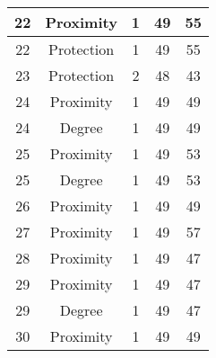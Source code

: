 \documentclass[results.tex]{subfiles}
\begin{document}
\begin{center}
\begin{tabular}{| c || c | c | c | c |}
            \hline
            22                      & Proximity                    & 1                      & 49                      & 55                   \\
            \hline
            22                      & Protection                   & 1                      & 49                      & 55                   \\
            \hline
            23                      & Protection                   & 2                      & 48                      & 43                   \\
            \hline
            24                      & Proximity                    & 1                      & 49                      & 49                   \\
            \hline
            24                      & Degree                       & 1                      & 49                      & 49                   \\
            \hline
            25                      & Proximity                    & 1                      & 49                      & 53                   \\
            \hline
            25                      & Degree                       & 1                      & 49                      & 53                   \\
            \hline
            26                      & Proximity                    & 1                      & 49                      & 49                   \\
            \hline
            27                      & Proximity                    & 1                      & 49                      & 57                   \\
            \hline
            28                      & Proximity                    & 1                      & 49                      & 47                   \\
            \hline
            29                      & Proximity                    & 1                      & 49                      & 47                   \\
            \hline
            29                      & Degree                       & 1                      & 49                      & 47                   \\
            \hline
            30                      & Proximity                    & 1                      & 49                      & 49                   \\

\end{tabular}
\end{center}
\end{document}
